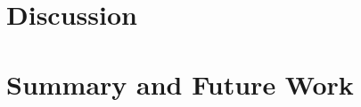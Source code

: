 \documentclass[10pt,journal,final,a4paper]{IEEEtran}
\begin{document}

\section{Discussion}
\label{sec:discussion}

\section{Summary and Future Work}
\label{sec:summary-future-work}

\balance 


\end{document}
